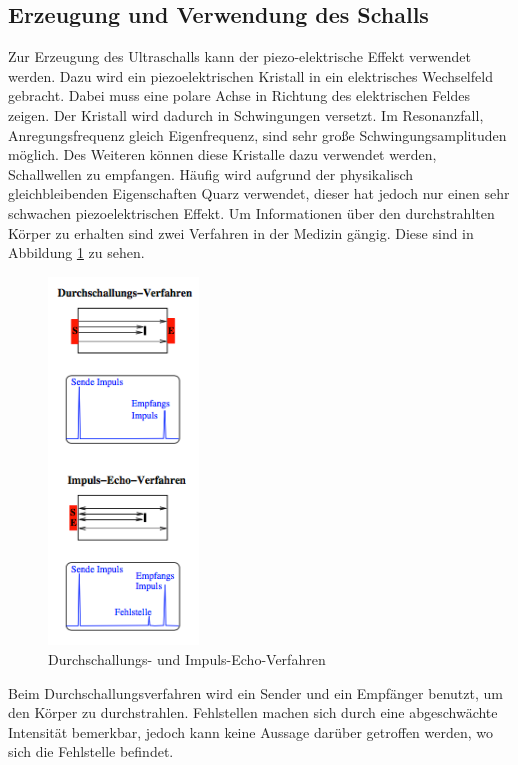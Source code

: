 \subsection{Erzeugung und Verwendung des Schalls}
Zur Erzeugung des Ultraschalls kann der piezo-elektrische Effekt verwendet werden.
Dazu wird ein  piezoelektrischen Kristall in ein elektrisches Wechselfeld gebracht.
Dabei muss eine polare Achse in Richtung des elektrischen Feldes zeigen. Der Kristall
wird dadurch in Schwingungen versetzt. Im Resonanzfall, Anregungsfrequenz gleich
Eigenfrequenz, sind sehr große Schwingungsamplituden möglich.
Des Weiteren können diese Kristalle dazu verwendet werden, Schallwellen zu
empfangen. Häufig wird aufgrund der physikalisch gleichbleibenden Eigenschaften
Quarz verwendet, dieser hat jedoch nur einen sehr schwachen piezoelektrischen
Effekt.
\newpage
Um Informationen über den durchstrahlten Körper zu erhalten sind zwei Verfahren in
der Medizin gängig. Diese sind in Abbildung \ref{fig:verfahren} zu sehen.
\begin{figure}
  \centering
  \includegraphics[width=4cm]{bilder/verfahren.png}
  \caption{Durchschallungs- und Impuls-Echo-Verfahren \cite{us2}}
  \label{fig:verfahren}
\end{figure}
Beim Durchschallungsverfahren wird ein Sender und ein Empfänger benutzt, um den
Körper zu durchstrahlen. Fehlstellen machen sich durch eine abgeschwächte
Intensität bemerkbar, jedoch kann keine Aussage darüber getroffen werden, wo
sich die Fehlstelle befindet.

